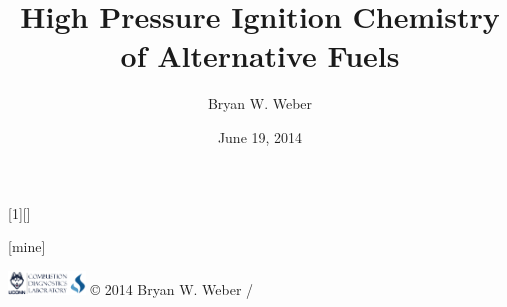 \title{High Pressure Ignition Chemistry of Alternative Fuels}
\author{Bryan W. Weber}
\date{June 19, 2014}

\usepackage{lmodern}

\AtBeginSection{\frame{\sectionpage}}

[1][]{%
}
[mine]

\usepackage{pgfplots}
\pgfplotsset{compat=1.10}
\usetikzlibrary{decorations.pathreplacing,calc,decorations.text}

\newcommand{\arcarrow}[9]%
{   \pgfmathsetmacro{\rin}{#1}
    \pgfmathsetmacro{\rmid}{#2}
    \pgfmathsetmacro{\rout}{#3}
    \pgfmathsetmacro{\astart}{#4}
    \pgfmathsetmacro{\aend}{#5}
    \pgfmathsetmacro{\atip}{#6}
    \fill[#7] (\astart:\rin) arc (\astart:\aend:\rin) -- (\aend+\atip:\rmid) -- (\aend:\rout) arc (\aend:\astart:\rout) -- (\astart+\atip:\rmid) -- cycle;
    \path[decoration={text along path, text={#8}, text color={#9}, text align={align=center}, raise=-0.5ex},decorate] (\astart+\atip:\rmid) arc (\astart+\atip:\aend+\atip:\rmid);
}

\newcommand{\tikzmark}[1]{\tikz[overlay,remember picture] \coordinate (#1);}

\beamertemplatenavigationsymbolsempty

{%
\begin{beamercolorbox}[sep=2mm]{}
\includegraphics[height=0.25in]{logo}
\hfill
{\color{gray} \copyright{} 2014 Bryan W. Weber \insertpagenumber{}/\insertpresentationendpage}
\end{beamercolorbox}
}%

\graphicspath{ {figures/} }

\usepackage[absolute,overlay]{textpos}

\usepackage{siunitx}
